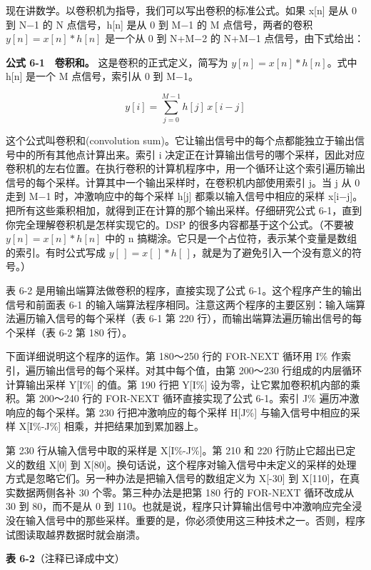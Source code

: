 现在讲数学。以卷积机为指导，我们可以写出卷积的标准公式。如果 x{[}n{]}
是从 0 到 N−1 的 N 点信号，h{[}n{]} 是从 0 到 M−1 的 M
点信号，两者的卷积 \(y[n] = x[n] * h[n]\) 是一个从 0 到 N+M−2 的 N+M−1
点信号，由下式给出：

\textbf{公式 6-1　卷积和。} 这是卷积的正式定义，简写为
\(y[n] = x[n] * h[n]\)。式中 h{[}n{]} 是一个 M 点信号，索引从 0 到 M−1。

\[
y[i] = \sum_{j=0}^{M-1} h[j]\, x[i-j]
\]

这个公式叫卷积和(convolution
sum)。它让输出信号中的每个点都能独立于输出信号中的所有其他点计算出来。索引
i
决定正在计算输出信号的哪个采样，因此对应卷积机的左右位置。在执行卷积的计算机程序中，用一个循环让这个索引遍历输出信号的每个采样。计算其中一个输出采样时，在卷积机内部使用索引
j。当 j 从 0 走到 M−1 时，冲激响应中的每个采样 h{[}j{]}
都乘以输入信号中相应的采样
x{[}i−j{]}。把所有这些乘积相加，就得到正在计算的那个输出采样。仔细研究公式
6-1，直到你完全理解卷积机是怎样实现它的。DSP
的很多内容都基于这个公式。（不要被 \(y[n] = x[n] * h[n]\) 中的 n
搞糊涂。它只是一个占位符，表示某个变量是数组的索引。有时公式写成
\(y[\,] = x[\,] * h[\,]\)，就是为了避免引入一个没有意义的符号。）

表 6-2 是用输出端算法做卷积的程序，直接实现了公式
6-1。这个程序产生的输出信号和前面表 6-1
的输入端算法程序相同。注意这两个程序的主要区别：输入端算法遍历输入信号的每个采样（表
6-1 第 220 行），而输出端算法遍历输出信号的每个采样（表 6-2 第 180
行）。

下面详细说明这个程序的运作。第 180～250 行的 FOR-NEXT 循环用 I\%
作索引，遍历输出信号的每个采样。对其中每个值，由第 200～230
行组成的内层循环计算输出采样 Y{[}I\%{]} 的值。第 190 行把 Y{[}I\%{]}
设为零，让它累加卷积机内部的乘积。第 200～240 行的 FOR-NEXT
循环直接实现了公式 6-1。索引 J\% 遍历冲激响应的每个采样。第 230
行把冲激响应的每个采样 H{[}J\%{]} 与输入信号中相应的采样 X{[}I\%-J\%{]}
相乘，并把结果加到累加器上。

第 230 行从输入信号中取的采样是 X{[}I\%-J\%{]}。第 210 和 220
行防止它超出已定义的数组 X{[}0{]} 到
X{[}80{]}。换句话说，这个程序对输入信号中未定义的采样的处理方式是忽略它们。另一种办法是把输入信号的数组定义为
X{[}-30{]} 到 X{[}110{]}，在真实数据两侧各补 30 个零。第三种办法是把第
180 行的 FOR-NEXT 循环改成从 30 到 80，而不是从 0 到
110。也就是说，程序只计算输出信号中冲激响应完全浸没在输入信号中的那些采样。重要的是，你必须使用这三种技术之一。否则，程序试图读取越界数据时就会崩溃。

\textbf{表 6-2}（注释已译成中文）

